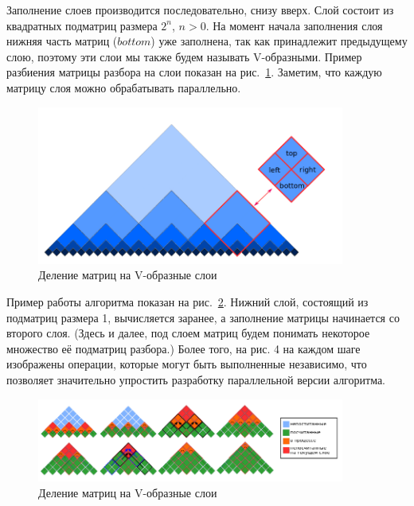 Заполнение слоев производится последовательно, снизу вверх. Слой состоит из квадратных подматриц размера $2^n$, $n > 0$. На момент начала заполнения слоя нижняя часть матриц ($bottom$) уже заполнена, так как принадлежит предыдущему слою, поэтому эти слои мы также будем называть V-образными. Пример разбиения матрицы разбора на слои показан на рис.~\ref{fig2}. Заметим, что каждую матрицу слоя можно обрабатывать параллельно.


\begin{figure}
\vspace{3mm}
 \begin{center}
    \centering
    \includegraphics[width=0.9\textwidth]{Susanina/pics/layers.png}
    \caption{Деление матриц на V-образные слои}
    \label{fig2}
 \end{center}
\vspace{-8mm}
\end{figure}

Пример работы алгоритма показан на рис.~\ref{modvis}. Нижний слой, состоящий из подматриц размера 1, вычисляется заранее, а заполнение матрицы начинается со второго слоя. (Здесь и далее, под слоем матриц будем понимать некоторое множество её подматриц разбора.) Более того, на рис. 4 на каждом шаге изображены операции, которые могут быть выполненные независимо, что позволяет значительно упростить разработку параллельной версии алгоритма.

\begin{figure}[h]
\vspace{3mm}
 \begin{center}
    \centering
    \includegraphics[width=0.9\textwidth]{Susanina/pics/modivis2.png}
    \caption{Деление матриц на V-образные слои}
    \label{modvis}
 \end{center}
\vspace{-8mm}
\end{figure}

